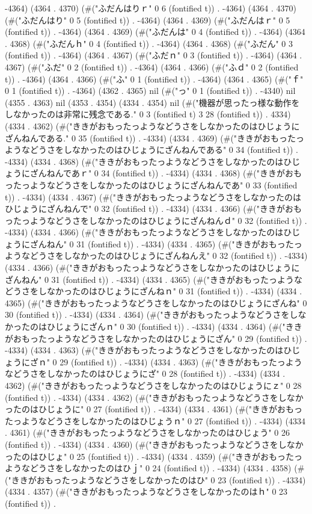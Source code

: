 -4364) (4364 . 4370) (#("ふだんはりｒ" 0 6 (fontified t)) . -4364) (4364 . 4370) (#("ふだんはり" 0 5 (fontified t)) . -4364) (4364 . 4369) (#("ふだんはｒ" 0 5 (fontified t)) . -4364) (4364 . 4369) (#("ふだんは" 0 4 (fontified t)) . -4364) (4364 . 4368) (#("ふだんｈ" 0 4 (fontified t)) . -4364) (4364 . 4368) (#("ふだん" 0 3 (fontified t)) . -4364) (4364 . 4367) (#("ふだｎ" 0 3 (fontified t)) . -4364) (4364 . 4367) (#("ふだ" 0 2 (fontified t)) . -4364) (4364 . 4366) (#("ふｄ" 0 2 (fontified t)) . -4364) (4364 . 4366) (#("ふ" 0 1 (fontified t)) . -4364) (4364 . 4365) (#("ｆ" 0 1 (fontified t)) . -4364) (4362 . 4365) nil (#("っ" 0 1 (fontified t)) . -4340) nil (4355 . 4363) nil (4353 . 4354) (4334 . 4354) nil (#("機器が思ったっ様な動作をしなかったのは非常に残念である." 0 3 (fontified t) 3 28 (fontified t)) . 4334) (4334 . 4362) (#("ききがおもったっようなどうさをしなかったのはひじょうにざんねんである." 0 35 (fontified t)) . -4334) (4334 . 4369) (#("ききがおもったっようなどうさをしなかったのはひじょうにざんねんである" 0 34 (fontified t)) . -4334) (4334 . 4368) (#("ききがおもったっようなどうさをしなかったのはひじょうにざんねんであｒ" 0 34 (fontified t)) . -4334) (4334 . 4368) (#("ききがおもったっようなどうさをしなかったのはひじょうにざんねんであ" 0 33 (fontified t)) . -4334) (4334 . 4367) (#("ききがおもったっようなどうさをしなかったのはひじょうにざんねんで" 0 32 (fontified t)) . -4334) (4334 . 4366) (#("ききがおもったっようなどうさをしなかったのはひじょうにざんねんｄ" 0 32 (fontified t)) . -4334) (4334 . 4366) (#("ききがおもったっようなどうさをしなかったのはひじょうにざんねん" 0 31 (fontified t)) . -4334) (4334 . 4365) (#("ききがおもったっようなどうさをしなかったのはひじょうにざんねんえ" 0 32 (fontified t)) . -4334) (4334 . 4366) (#("ききがおもったっようなどうさをしなかったのはひじょうにざんねん" 0 31 (fontified t)) . -4334) (4334 . 4365) (#("ききがおもったっようなどうさをしなかったのはひじょうにざんねｎ" 0 31 (fontified t)) . -4334) (4334 . 4365) (#("ききがおもったっようなどうさをしなかったのはひじょうにざんね" 0 30 (fontified t)) . -4334) (4334 . 4364) (#("ききがおもったっようなどうさをしなかったのはひじょうにざんｎ" 0 30 (fontified t)) . -4334) (4334 . 4364) (#("ききがおもったっようなどうさをしなかったのはひじょうにざん" 0 29 (fontified t)) . -4334) (4334 . 4363) (#("ききがおもったっようなどうさをしなかったのはひじょうにざｎ" 0 29 (fontified t)) . -4334) (4334 . 4363) (#("ききがおもったっようなどうさをしなかったのはひじょうにざ" 0 28 (fontified t)) . -4334) (4334 . 4362) (#("ききがおもったっようなどうさをしなかったのはひじょうにｚ" 0 28 (fontified t)) . -4334) (4334 . 4362) (#("ききがおもったっようなどうさをしなかったのはひじょうに" 0 27 (fontified t)) . -4334) (4334 . 4361) (#("ききがおもったっようなどうさをしなかったのはひじょうｎ" 0 27 (fontified t)) . -4334) (4334 . 4361) (#("ききがおもったっようなどうさをしなかったのはひじょう" 0 26 (fontified t)) . -4334) (4334 . 4360) (#("ききがおもったっようなどうさをしなかったのはひじょ" 0 25 (fontified t)) . -4334) (4334 . 4359) (#("ききがおもったっようなどうさをしなかったのはひｊ" 0 24 (fontified t)) . -4334) (4334 . 4358) (#("ききがおもったっようなどうさをしなかったのはひ" 0 23 (fontified t)) . -4334) (4334 . 4357) (#("ききがおもったっようなどうさをしなかったのはｈ" 0 23 (fontified t)) . 
